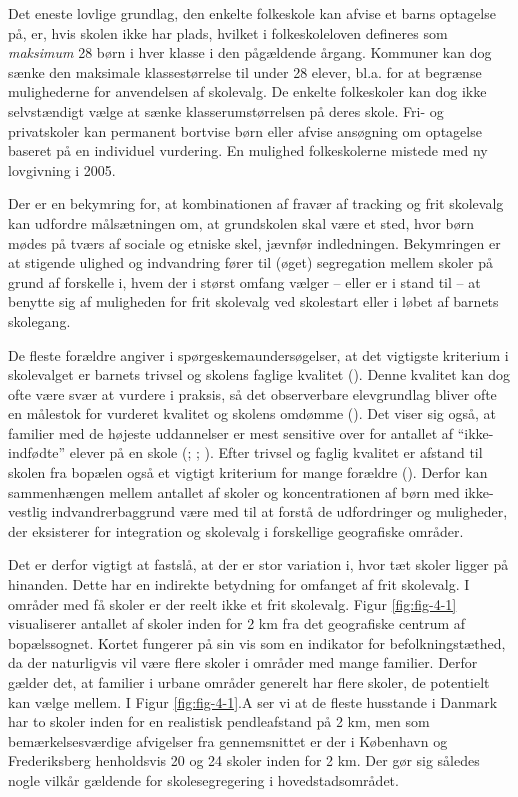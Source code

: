 \documentclass[
]{book}
\begin{document}
Det eneste lovlige grundlag, den enkelte folkeskole kan afvise et barns optagelse på, er, hvis skolen ikke har plads, hvilket i folkeskoleloven defineres som \emph{maksimum} 28 børn i hver klasse i den pågældende årgang. Kommuner kan dog sænke den maksimale klassestørrelse til under 28 elever, bl.a. for at begrænse mulighederne for anvendelsen af skolevalg. De enkelte folkeskoler kan dog ikke selvstændigt vælge at sænke klasserumstørrelsen på deres skole. Fri- og privatskoler kan permanent bortvise børn eller afvise ansøgning om optagelse baseret på en individuel vurdering. En mulighed folkeskolerne mistede med ny lovgivning i 2005.

Der er en bekymring for, at kombinationen af fravær af tracking og frit skolevalg kan udfordre målsætningen om, at grundskolen skal være et sted, hvor børn mødes på tværs af sociale og etniske skel, jævnfør indledningen. Bekymringen er at stigende ulighed og indvandring fører til (øget) segregation mellem skoler på grund af forskelle i, hvem der i størst omfang vælger -- eller er i stand til -- at benytte sig af muligheden for frit skolevalg ved skolestart eller i løbet af barnets skolegang.

De fleste forældre angiver i spørgeskemaundersøgelser, at det vigtigste kriterium i skolevalget er barnets trivsel og skolens faglige kvalitet (). Denne kvalitet kan dog ofte være svær at vurdere i praksis, så det observerbare elevgrundlag bliver ofte en målestok for vurderet kvalitet og skolens omdømme (). Det viser sig også, at familier med de højeste uddannelser er mest sensitive over for antallet af ``ikke-indfødte'' elever på en skole (; ; ). Efter trivsel og faglig kvalitet er afstand til skolen fra bopælen også et vigtigt kriterium for mange forældre (). Derfor kan sammenhængen mellem antallet af skoler og koncentrationen af børn med ikke-vestlig indvandrerbaggrund være med til at forstå de udfordringer og muligheder, der eksisterer for integration og skolevalg i forskellige geografiske områder.

Det er derfor vigtigt at fastslå, at der er stor variation i, hvor tæt skoler ligger på hinanden. Dette har en indirekte betydning for omfanget af frit skolevalg. I områder med få skoler er der reelt ikke et frit skolevalg. Figur \ref{fig:fig-4-1} visualiserer antallet af skoler inden for 2 km fra det geografiske centrum af bopælssognet. Kortet fungerer på sin vis som en indikator for befolkningstæthed, da der naturligvis vil være flere skoler i områder med mange familier. Derfor gælder det, at familier i urbane områder generelt har flere skoler, de potentielt kan vælge mellem. I Figur \ref{fig:fig-4-1}.A ser vi at de fleste husstande i Danmark har to skoler inden for en realistisk pendleafstand på 2 km, men som bemærkelsesværdige afvigelser fra gennemsnittet er der i København og Frederiksberg henholdsvis 20 og 24 skoler inden for 2 km. Der gør sig således nogle vilkår gældende for skolesegregering i hovedstadsområdet.
\end{document}
